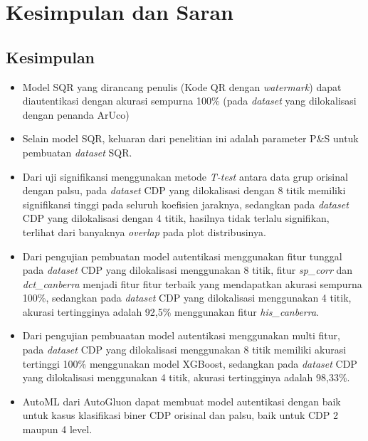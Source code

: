 \chapter{Kesimpulan dan Saran}

\section{Kesimpulan}
\begin{itemize}
      \item Model SQR yang dirancang penulis (Kode QR dengan \emph{watermark}) dapat diautentikasi dengan akurasi sempurna 100\% (pada \emph{dataset} yang dilokalisasi
            dengan penanda ArUco)
      \item Selain model SQR, keluaran dari penelitian ini adalah parameter P\&S untuk pembuatan \emph{dataset} SQR.
      \item Dari uji signifikansi menggunakan metode \emph{T-test} antara data grup orisinal dengan palsu, pada \emph{dataset} CDP yang dilokalisasi dengan 8 titik
            memiliki signifikansi tinggi pada seluruh koefisien jaraknya, sedangkan pada \emph{dataset} CDP yang dilokalisasi dengan 4 titik, hasilnya tidak terlalu
            signifikan, terlihat dari banyaknya \emph{overlap} pada plot distribusinya.
      \item Dari pengujian pembuatan model autentikasi menggunakan fitur tunggal pada \emph{dataset} CDP yang dilokalisasi menggunakan 8 titik, fitur \emph{sp\_corr} dan
            \emph{dct\_canberra} menjadi fitur fitur terbaik yang mendapatkan akurasi sempurna 100\%, sedangkan pada \emph{dataset} CDP yang dilokalisasi menggunakan 4
            titik, akurasi tertingginya adalah 92,5\% menggunakan fitur \emph{his\_canberra}.
      \item Dari pengujian pembuaatan model autentikasi menggunakan multi fitur, pada \emph{dataset} CDP yang dilokalisasi menggunakan 8 titik memiliki akurasi tertinggi
            100\% menggunakan model XGBoost, sedangkan pada \emph{dataset} CDP yang dilokalisasi menggunakan 4 titik, akurasi tertingginya adalah 98,33\%.
      \item AutoML dari AutoGluon dapat membuat model autentikasi dengan baik untuk kasus klasifikasi biner CDP orisinal dan palsu, baik untuk CDP 2 maupun 4 level.
\end{itemize}

